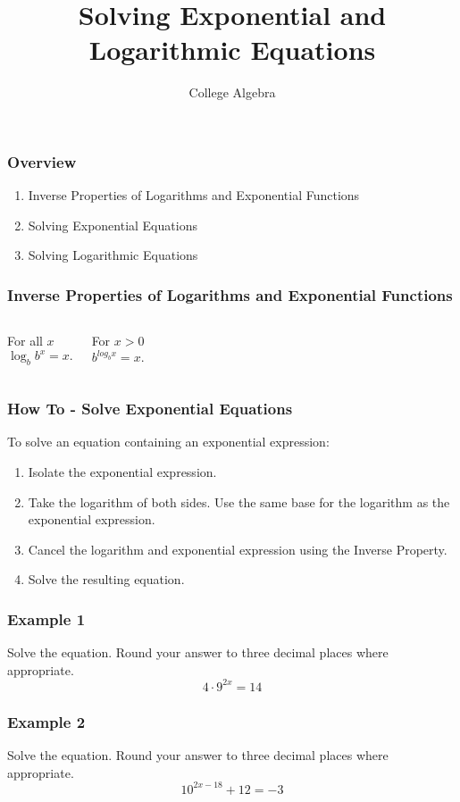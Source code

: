 \documentclass[aspectratio=169,17pt]{beamer}
\title{Solving Exponential and Logarithmic Equations}
\subtitle{College Algebra}
\author{}
\date{}
\begin{document}
\begin{frame}
	\titlepage
\end{frame}

\begin{frame}
	\frametitle{Overview}
	 
	\begin{enumerate}
		\item Inverse Properties of Logarithms and Exponential Functions  
		\item Solving Exponential Equations  
		\item Solving Logarithmic Equations
	\end{enumerate}
\end{frame}

\begin{frame}
	\frametitle{Inverse Properties of Logarithms and Exponential Functions}
	\begin{columns}
		For all $x$
		$$\log_b{b^x} = x.$$

		For $x > 0$
		$$b^{log_b{x}} = x.$$
	\end{columns}
\end{frame}

\begin{frame}
	\frametitle{How To - Solve Exponential Equations}
	To solve an equation containing an exponential expression:  
	\begin{enumerate}
		\item Isolate the exponential expression.  
		\item Take the logarithm of both sides. Use the same base for the logarithm as the exponential expression.  
		\item Cancel the logarithm and exponential expression using the Inverse Property.  
		\item Solve the resulting equation.
	\end{enumerate}
\end{frame}

\begin{frame}[t]
	\frametitle{Example 1}
	Solve the equation. Round your answer to three decimal places where appropriate.
	$$4 \cdot 9^{2x} = 14$$
\end{frame}

\begin{frame}[t]
	\frametitle{Example 2}
	Solve the equation. Round your answer to three decimal places where appropriate.
	$$10^{2x-18} + 12 = -3$$
\end{frame}
\end{document}
